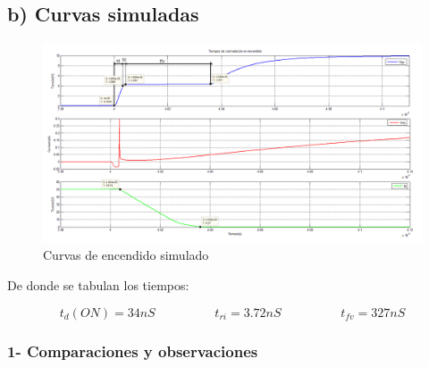 \documentclass[e4_tp1_main.tex]{subfiles}
\begin{document}
\subsection*{b) Curvas simuladas} 
 
\begin{figure}[H]
\centering
\includegraphics[width=1\linewidth]{Imagenes/Punto1/tiempo_encendidoX.png}
\caption{Curvas de encendido simulado}
\end{figure}



De donde se tabulan los tiempos:

\[
t_d(ON) = 34nS \hspace{2cm} t_{ri} = 3.72nS \hspace{2cm} t_{fv} = 327nS
\]

\subsubsection*{1- Comparaciones y observaciones}
\end{document}

